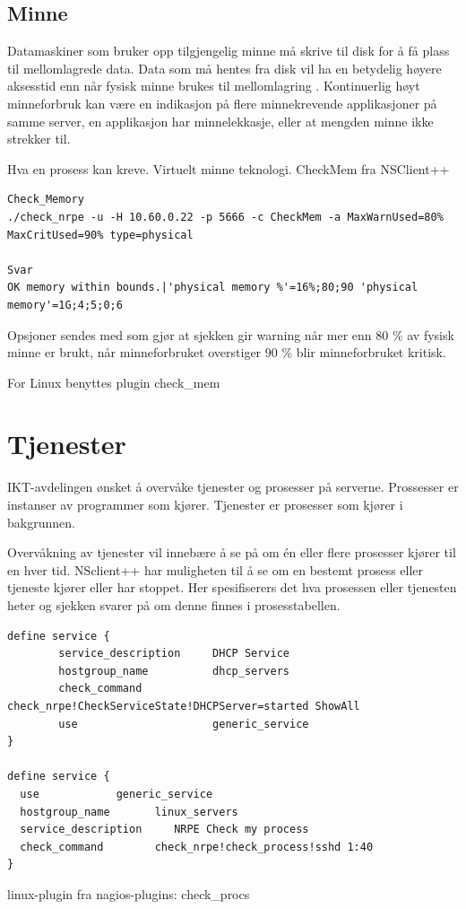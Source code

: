 \subsection{Minne}
Datamaskiner som bruker opp tilgjengelig minne må skrive til disk for å få plass til mellomlagrede data. Data som må hentes fra disk vil ha en betydelig høyere aksesstid enn når fysisk minne brukes til mellomlagring \cite{wiki:mem}. 
Kontinuerlig høyt minneforbruk kan være en indikasjon på flere minnekrevende applikasjoner på samme server, en applikasjon har minnelekkasje, eller at mengden minne ikke strekker til.

Hva en prosess kan kreve. Virtuelt minne teknologi. CheckMem fra NSClient++

\begin{lstlisting}
Check_Memory
./check_nrpe -u -H 10.60.0.22 -p 5666 -c CheckMem -a MaxWarnUsed=80% MaxCritUsed=90% type=physical

Svar
OK memory within bounds.|'physical memory %'=16%;80;90 'physical memory'=1G;4;5;0;6
\end{lstlisting}

Opsjoner sendes med som gjør at sjekken gir warning når mer enn 80 \% av fysisk minne er brukt, når minneforbruket overstiger 90 \% blir minneforbruket kritisk.

For Linux benyttes plugin check\_mem \cite{checklinuxmem}

\section{Tjenester}
IKT-avdelingen ønsket å overvåke tjenester og prosesser på serverne. Prossesser er instanser av programmer som kjører. Tjenester er prosesser som kjører i bakgrunnen. 

Overvåkning av tjenester vil innebære å se på om én eller flere prosesser kjører
til en hver tid. NSclient++ har muligheten til å se om en bestemt prosess eller tjeneste kjører eller har stoppet. Her spesifiserers det hva prosessen eller tjenesten heter og sjekken svarer på om denne finnes i prosesstabellen.
\begin{lstlisting}
define service {
        service_description     DHCP Service
        hostgroup_name          dhcp_servers
        check_command           check_nrpe!CheckServiceState!DHCPServer=started ShowAll
        use                     generic_service
}

define service {
  use            generic_service
  hostgroup_name       linux_servers
  service_description     NRPE Check my process
  check_command        check_nrpe!check_process!sshd 1:40
}
\end{lstlisting}
linux-plugin fra nagios-plugins: check\_procs 

